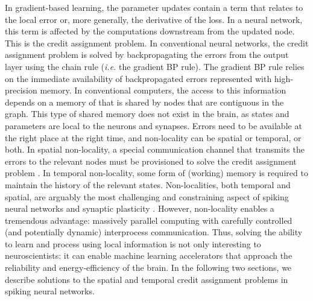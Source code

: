 \documentclass[journal,onecolumn,11pt]{IEEEtran}
\begin{document}
In gradient-based learning, the parameter updates contain a term that relates to the local error or, more generally, the derivative of the loss. In a neural network, this term is affected by the computations downstream from the updated node. This is the credit assignment problem. In conventional neural networks, the credit assignment problem is solved by backpropagating the errors from the output layer using the chain rule (\emph{i.e.} the gradient BP rule).
The gradient BP rule relies on the immediate availability of backpropagated errors represented with high-precision memory. In conventional computers, the access to this information depends on a memory of that is shared by nodes that are contiguous in the graph.
This type of shared memory does not exist in the brain, as states and parameters are local to the neurons and synapses.
Errors need to be available at the right place at the right time, and non-locality can be spatial or temporal, or both.
In spatial non-locality, a special communication channel that transmits the errors to the relevant nodes must be provisioned to solve the credit assignment problem \cite{Baldi_Sadowski16_theoloca}. 
In temporal non-locality, some form of (working) memory is required to maintain the history of the relevant states. 
Non-localities, both temporal and spatial, are arguably the most challenging and constraining aspect of spiking neural networks and synaptic plasticity \cite{Neftci18_datapowe}. 
However, non-locality enables a tremendous advantage: massively parallel computing with carefully controlled (and potentially dynamic) interprocess communication. 
Thus, solving the ability to learn and process using local information is not only interesting to neuroscientists: it can enable machine learning accelerators that approach the reliability and energy-efficiency of the brain.
In the following two sections, we describe solutions to the spatial and temporal credit assignment problems in spiking neural networks.
\end{document}
